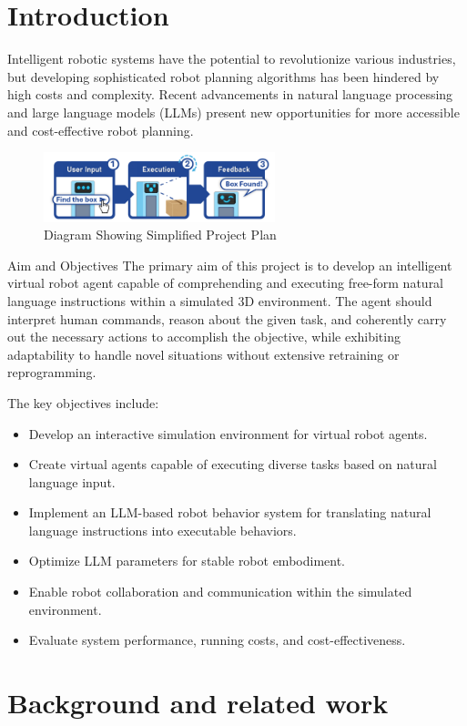 \documentclass[pdflatex,sn-mathphys-num]{sn-jnl}%
\theoremstyle{thmstyleone}%
\theoremstyle{thmstyletwo}%
\theoremstyle{thmstylethree}%
\begin{document}
\section{Introduction}\label{sec1}
Intelligent robotic systems have the potential to revolutionize various industries, but developing sophisticated robot planning algorithms has been hindered by high costs and complexity. Recent advancements in natural language processing and large language models (LLMs) present new opportunities for more accessible and cost-effective robot planning.

\begin{figure}[h]
\centering
\includegraphics[width=0.6\textwidth]{figures/Picture13.png}
\caption{Diagram Showing Simplified Project Plan}\label{fig1}
\end{figure}
Aim and Objectives
The primary aim of this project is to develop an intelligent virtual robot agent capable of comprehending and executing free-form natural language instructions within a simulated 3D environment. The agent should interpret human commands, reason about the given task, and coherently carry out the necessary actions to accomplish the objective, while exhibiting adaptability to handle novel situations without extensive retraining or reprogramming.

The key objectives include:
\begin{itemize}
    \item Develop an interactive simulation environment for virtual robot agents.
    \item Create virtual agents capable of executing diverse tasks based on natural language input.
    \item Implement an LLM-based robot behavior system for translating natural language instructions into executable behaviors.
    \item Optimize LLM parameters for stable robot embodiment.
    \item Enable robot collaboration and communication within the simulated environment.
    \item Evaluate system performance, running costs, and cost-effectiveness.
\end{itemize}

\section{Background and related work}
\end{document}
